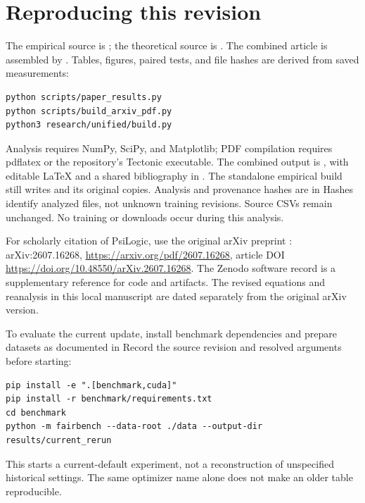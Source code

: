 \documentclass[11pt,a4paper]{article}
\theoremstyle{definition}
\theoremstyle{remark}
\begin{document}
\section{Reproducing this revision}

The empirical source is ; the theoretical source is . The combined article is assembled by . Tables, figures, paired tests, and file hashes are derived from saved measurements:

\begin{Verbatim}[fontsize=\small]
python scripts/paper_results.py
python scripts/build_arxiv_pdf.py
python3 research/unified/build.py
\end{Verbatim}

Analysis requires NumPy, SciPy, and Matplotlib; PDF compilation requires pdflatex or the repository's Tectonic executable. The combined output is , with editable LaTeX and a shared bibliography in . The standalone empirical build still writes  and its original copies. Analysis and provenance hashes are in  Hashes identify analyzed files, not unknown training revisions. Source CSVs remain unchanged. No training or downloads occur during this analysis.

For scholarly citation of PsiLogic, use the original arXiv preprint \citep{psilogic2026preprint}: arXiv:2607.16268, \url{https://arxiv.org/pdf/2607.16268}, article DOI \url{https://doi.org/10.48550/arXiv.2607.16268}. The Zenodo software record \citep{psilogicsoftware} is a supplementary reference for code and artifacts. The revised equations and reanalysis in this local manuscript are dated separately from the original arXiv version.

To evaluate the current update, install benchmark dependencies and prepare datasets as documented in  Record the source revision and resolved arguments before starting:

\begin{Verbatim}[fontsize=\small]
pip install -e ".[benchmark,cuda]"
pip install -r benchmark/requirements.txt
cd benchmark
python -m fairbench --data-root ./data --output-dir results/current_rerun
\end{Verbatim}

This starts a current-default experiment, not a reconstruction of unspecified historical settings. The same optimizer name alone does not make an older table reproducible.
\end{document}
